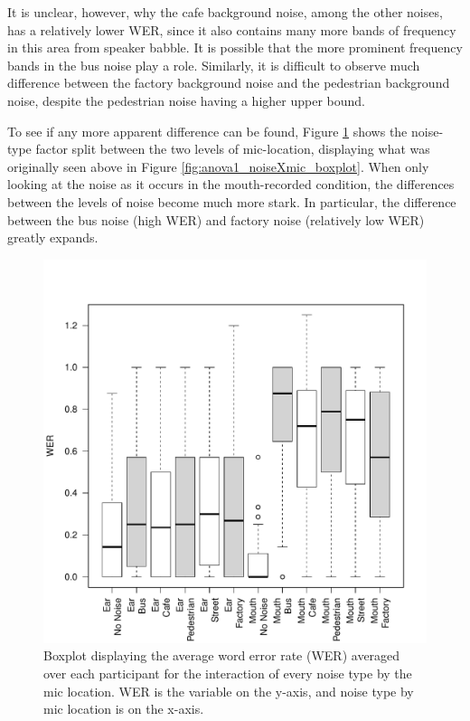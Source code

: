 \documentclass[dissertation,copyright]{uathesis}
\makeatletter
\def\maxwidth{ %
  \ifdim\Gin@nat@width>\linewidth
    \linewidth
  \else
    \Gin@nat@width
  \fi
}
\makeatother
\begin{document}
It is unclear, however, why the cafe background noise, among the other noises, has a relatively lower WER, since it also contains many more bands of frequency in this area from speaker babble. It is possible that the more prominent frequency bands in the bus noise play a role.  Similarly, it is difficult to observe much difference between the factory background noise and the pedestrian background noise, despite the pedestrian noise having a higher upper bound.

To see if any more apparent difference can be found, Figure \ref{fig:noiseXmic2} shows the noise-type factor split between the two levels of mic-location, displaying what was originally seen above in Figure \ref{fig:anova1_noiseXmic_boxplot}.  When only looking at the noise as it occurs in the mouth-recorded condition, the differences between the levels of noise become much more stark.  In particular, the difference between the bus noise (high WER) and factory noise (relatively low WER) greatly expands. 
%
\begin{figure}

\includegraphics[width=\maxwidth]{figure/boxplot_noiseXmic2-1} 

\caption{Boxplot displaying the average word error rate (WER) averaged over each participant for the interaction of every noise type by the mic location. WER is the variable on the y-axis, and noise type by mic location is on the x-axis.}
\label{fig:noiseXmic2}
\end{figure}
\end{document}

